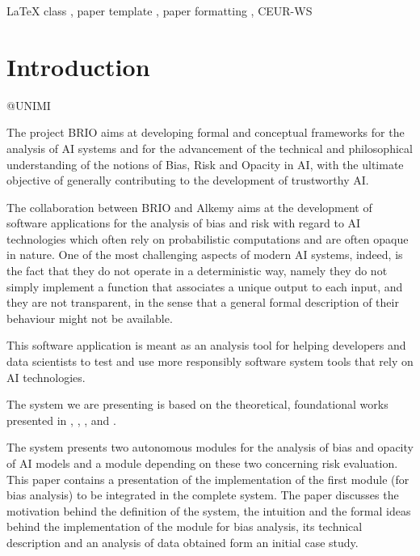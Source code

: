 \documentclass[
]{ceurart}
\begin{document}
\begin{keywords}
  LaTeX class \sep
  paper template \sep
  paper formatting \sep
  CEUR-WS
\end{keywords}

\maketitle

\section{Introduction}


@UNIMI



The project BRIO aims at developing formal and conceptual frameworks for the analysis of AI systems and for the advancement of the technical and philosophical understanding of the notions of Bias, Risk and Opacity in AI, with the ultimate objective of generally contributing to the development of trustworthy AI. 


The collaboration between BRIO and Alkemy aims at the development of software applications for the analysis of bias and risk with regard to AI technologies which often rely on probabilistic computations and  are often opaque in nature. One of the most challenging aspects of modern AI systems, indeed, is the fact that they do not operate in a deterministic way, namely they do not simply implement a function that associates a unique output to each input, and they are not transparent, in the sense that a general formal description of their behaviour might not be available.

This software application is meant as an analysis tool for helping developers and data scientists to test and use more responsibly software system tools that rely on AI technologies.

The system we are presenting is based on the theoretical, foundational works presented in \cite{pk16}, \cite{dap21}, \cite{dagp22}, and \cite{gp23}.


The system presents two autonomous modules for the analysis of bias and opacity of AI models and a module depending on these two concerning risk evaluation. This paper contains a presentation of the implementation of the first module (for bias analysis) to be integrated in the complete system. The paper discusses the motivation behind the definition of the system, the intuition and the formal ideas behind the implementation of the module for bias analysis, its technical description and an analysis of data obtained form an initial case study.
\end{document}
